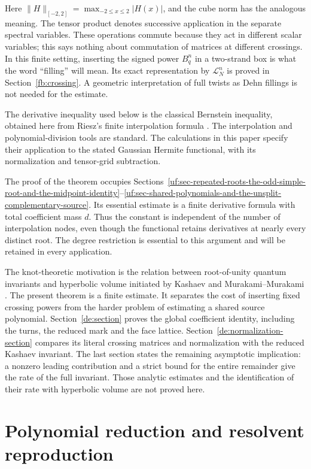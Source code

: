\documentclass[11pt]{article}
\numberwithin{equation}{section}
\theoremstyle{definition}\newtheorem{definition}[theorem]{Definition}
\theoremstyle{remark}\newtheorem{remark}[theorem]{Remark}
\begin{document}
Here $\|H\|_{[-2,2]}=\max_{-2\le x\le2}|H(x)|$, and the cube norm
has the analogous meaning. The tensor product denotes successive
application in the separate spectral variables. These operations
commute because they act in different scalar variables; this says
nothing about commutation of matrices at different crossings.
In this finite setting, inserting the signed power $B_q^n$ in a
two-strand box is what the word ``filling'' will mean. Its exact
representation by $\mathcal L_N^n$ is proved in
Section~\ref{fb:crossing}. A geometric interpretation of full twists
as Dehn fillings is not needed for the estimate.

The derivative inequality used below is the classical Bernstein
inequality, obtained here from Riesz's finite interpolation formula
\cite{Riesz1914}. The interpolation and polynomial-division tools
are standard. The calculations in this paper specify their application
to the stated Gaussian Hermite functional, with its normalization
and tensor-grid subtraction.

The proof of the theorem occupies Sections~\ref{uf:sec-repeated-roots-the-odd-simple-root-and-the-midpoint-identity}--\ref{uf:sec-shared-polynomials-and-the-unsplit-complementary-source}.
Its essential estimate is a finite derivative formula with total
coefficient mass $d$. Thus the constant is independent of the number
of interpolation nodes, even though the functional retains derivatives
at nearly every distinct root. The degree restriction is essential to
this argument and will be retained in every application.

The knot-theoretic motivation is the relation between root-of-unity
quantum invariants and hyperbolic volume initiated by Kashaev
\cite{Kashaev1997} and Murakami--Murakami \cite{MurakamiMurakami2001}.
The present theorem is a finite estimate. It separates the cost of
inserting fixed crossing powers from the harder problem of estimating
a shared source polynomial. Section~\ref{de:section} proves the global
coefficient identity, including the turns, the reduced mark and the face
lattice. Section~\ref{de:normalization-section} compares its literal
crossing matrices and normalization with the reduced Kashaev invariant.
The last section states the remaining asymptotic implication: a nonzero
leading contribution and a strict bound for the entire remainder give
the rate of the full invariant. Those analytic estimates and the
identification of their rate with hyperbolic volume are not proved here.

\section{Polynomial reduction and resolvent reproduction}
\label{uf:sec-canonical-reduction}
\end{document}
